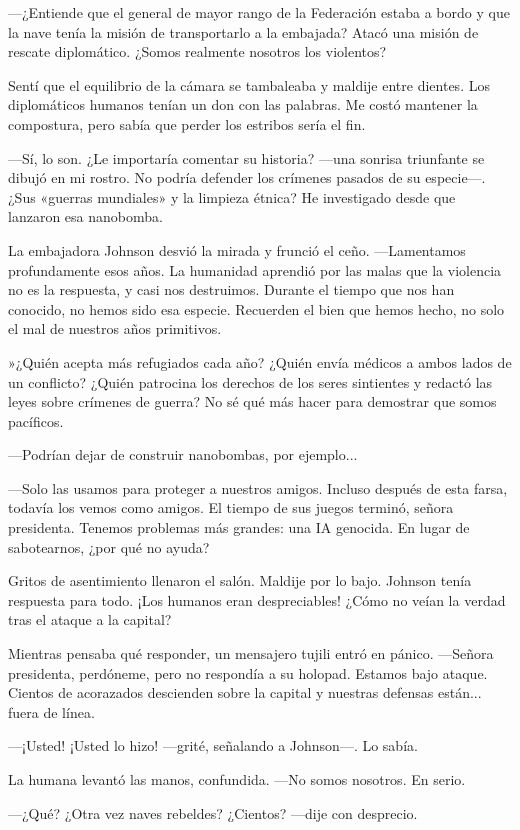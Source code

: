  —¿Entiende que el general de mayor rango de la Federación estaba a bordo y que la nave tenía la misión de transportarlo a la embajada? Atacó una misión de rescate diplomático. ¿Somos realmente nosotros los violentos?

Sentí que el equilibrio de la cámara se tambaleaba y maldije entre dientes. Los diplomáticos humanos tenían un don con las palabras. Me costó mantener la compostura, pero sabía que perder los estribos sería el fin.

—Sí, lo son. ¿Le importaría comentar su historia? —una sonrisa triunfante se dibujó en mi rostro. No podría defender los crímenes pasados de su especie—. ¿Sus «guerras mundiales» y la limpieza étnica? He investigado desde que lanzaron esa nanobomba.

La embajadora Johnson desvió la mirada y frunció el ceño. —Lamentamos profundamente esos años. La humanidad aprendió por las malas que la violencia no es la respuesta, y casi nos destruimos. Durante el tiempo que nos han conocido, no hemos sido esa especie. Recuerden el bien que hemos hecho, no solo el mal de nuestros años primitivos.

»¿Quién acepta más refugiados cada año? ¿Quién envía médicos a ambos lados de un conflicto? ¿Quién patrocina los derechos de los seres sintientes y redactó las leyes sobre crímenes de guerra? No sé qué más hacer para demostrar que somos pacíficos.

—Podrían dejar de construir nanobombas, por ejemplo...

—Solo las usamos para proteger a nuestros amigos. Incluso después de esta farsa, todavía los vemos como amigos. El tiempo de sus juegos terminó, señora presidenta. Tenemos problemas más grandes: una IA genocida. En lugar de sabotearnos, ¿por qué no ayuda?

Gritos de asentimiento llenaron el salón. Maldije por lo bajo. Johnson tenía respuesta para todo. ¡Los humanos eran despreciables! ¿Cómo no veían la verdad tras el ataque a la capital?

Mientras pensaba qué responder, un mensajero tujili entró en pánico. —Señora presidenta, perdóneme, pero no respondía a su holopad. Estamos bajo ataque. Cientos de acorazados descienden sobre la capital y nuestras defensas están... fuera de línea.

—¡Usted! ¡Usted lo hizo! —grité, señalando a Johnson—. Lo sabía.

La humana levantó las manos, confundida. —No somos nosotros. En serio.

 —¿Qué? ¿Otra vez naves rebeldes? ¿Cientos? —dije con desprecio.

